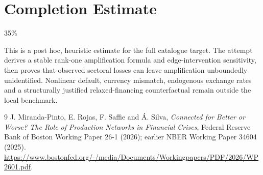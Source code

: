\documentclass[11pt]{article}
\theoremstyle{definition}
\begin{document}
\section{Completion Estimate}
35\%

This is a post hoc, heuristic estimate for the full catalogue target.
The attempt derives a stable rank-one amplification formula and edge-intervention sensitivity, then proves that observed sectoral losses can leave amplification unboundedly unidentified. Nonlinear default, currency mismatch, endogenous exchange rates and a structurally justified relaxed-financing counterfactual remain outside the local benchmark.

\begin{thebibliography}{9}
 J. Miranda-Pinto, E. Rojas, F. Saffie and \'A. Silva,
\emph{Connected for Better or Worse? The Role of Production Networks in
Financial Crises}, Federal Reserve Bank of Boston Working Paper 26-1
(2026); earlier NBER Working Paper 34604 (2025).
\url{https://www.bostonfed.org/-/media/Documents/Workingpapers/PDF/2026/WP2601.pdf}.
\end{thebibliography}
\end{document}

